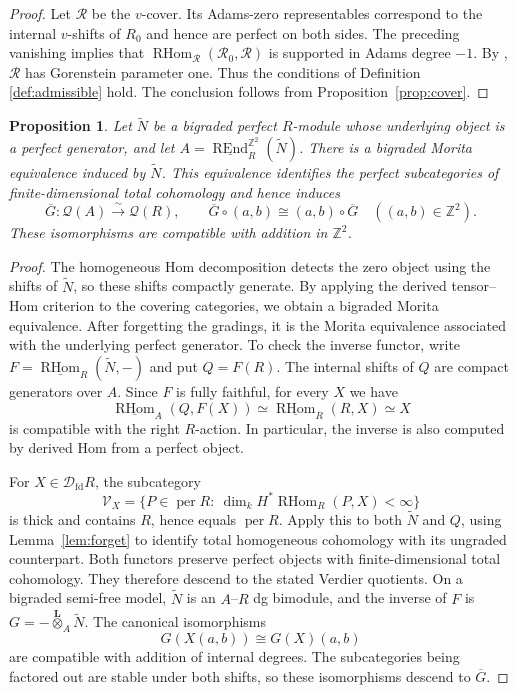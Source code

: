\documentclass[12pt,a4paper,english,reqno]{amsart}
\theoremstyle{plain}
\newtheorem{prp}[thm]{Proposition}
\theoremstyle{definition}
\numberwithin{equation}{section}
\newcommand{\prpref}[1]{Proposition~\ref{#1}}
\newcommand{\lemref}[1]{Lemma~\ref{#1}}
\def\perf{\operatorname{per}}
\def\calD{{\mathcal D}}
\def\bbZ{{\mathbb Z}}
\def\Lox{\overset{\mathbf{L}}{\otimes}}
\def\RHom{\operatorname{RHom}}
\def\REnd{\operatorname{REnd}}
\def\fd{\mathrm{fd}}
\newcommand{\uRHom}{\underline{\RHom}}
\newcommand{\uREnd}{\underline{\REnd}}
\begin{document}
\begin{proof}
Let $\mathcal R$ be the $v$-cover. Its Adams-zero representables correspond to the internal $v$-shifts of $R_0$ and hence are perfect on both sides. The preceding vanishing implies that
$\RHom_{\mathcal R}(\mathcal R_0,\mathcal R)$ is supported in Adams degree $-1$. By \cite[Lemma A.4]{Han}, $\mathcal R$ has Gorenstein parameter one. Thus the conditions of Definition \ref{def:admissible} hold. The conclusion follows from \prpref{prop:cover}.
\end{proof}

\begin{prp}\label{prop:morita-descent}
Let $\widetilde N$ be a bigraded perfect $R$-module whose underlying object is a perfect generator, and let
$A=\uREnd_R^{\bbZ^2}(\widetilde N)$. There is a bigraded Morita equivalence induced by $\widetilde N$. This equivalence identifies the perfect subcategories of finite-dimensional total cohomology and hence induces
\[
 \overline G:\mathcal Q(A)\xrightarrow{\sim}\mathcal Q(R),
 \qquad
 \overline G\circ(a,b)\cong(a,b)\circ\overline G
 \quad((a,b)\in\bbZ^2).
\]
These isomorphisms are compatible with addition in $\bbZ^2$.
\end{prp}
\begin{proof}
The homogeneous Hom decomposition detects the zero object using the shifts of $\widetilde N$, so these shifts compactly generate. By applying the derived tensor--Hom criterion \cite[Lemma 3.10]{KellerDG} to the covering categories, we obtain a bigraded Morita equivalence. After forgetting the gradings, it is the Morita equivalence associated with the underlying perfect generator. To check the inverse functor, write $F=\uRHom_R(\widetilde N,-)$ and put $Q=F(R)$. The internal shifts of $Q$ are compact generators over $A$. Since $F$ is fully faithful, for every $X$ we have
\[
 \uRHom_A(Q,F(X))\simeq\uRHom_R(R,X)\simeq X
\]
is compatible with the right $R$-action. In particular, the inverse is also computed by derived Hom from a perfect object.

For $X\in\calD_{\fd}R$, the subcategory
\[
 \mathcal V_X=\{P\in\perf R:\ \dim_kH^*\RHom_R(P,X)<\infty\}
\]
is thick and contains $R$, hence equals $\perf R$. Apply this to both $\widetilde N$ and $Q$, using \lemref{lem:forget} to identify total homogeneous cohomology with its ungraded counterpart. Both functors preserve perfect objects with finite-dimensional total cohomology. They therefore descend to the stated Verdier quotients.
On a bigraded semi-free model, $\widetilde N$ is an $A$--$R$
dg bimodule, and the inverse of $F$ is
$G=-\Lox_A\widetilde N$. The canonical isomorphisms
\[
 G(X(a,b))\cong G(X)(a,b)
\]
are compatible with addition of internal degrees. The subcategories
being factored out are stable under both shifts, so these
isomorphisms descend to $\overline G$.
\end{proof}
\end{document}
